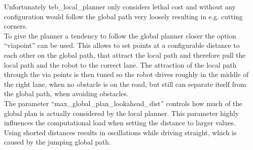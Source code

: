 Unfortunately teb\_local\_planner only considers lethal cost and without any configuration would follow the global path very loosely resulting in e.g. cutting corners.\\ 

To give the planner a tendency to follow the global planner closer the option ``viapoint'' can be used. This allows to set points at a configurable distance to each other on the global path, that attract the local path and therefore pull the local path and the robot to the correct lane. The attraction of the local path through the via points is then tuned so the robot drives roughly in the middle of the right lane, when no obstacle is on the road, but still can separate itself from the global path, when avoiding obstacles.\\

The parameter ``max\_global\_plan\_lookahead\_dist'' controls how much of the global plan is actually considered by the local planner. This parameter highly influences the computational load when setting the distance to larger values. Using shorted distances results in oscillations while driving straight, which is caused by the jumping global path.






















